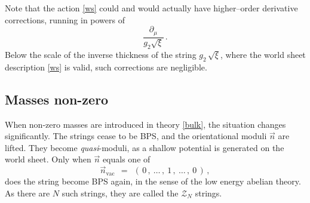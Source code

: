 \documentclass[12pt]{article}
\def\beq{\begin{equation}}
\def\eeq{\end{equation}}
\newcommand{\p}{\partial}
\newcommand{\mc}[1]{\mathcal{#1}}
\newcommand{\nvac}{\vec{n}{}_\text{vac}}
\begin{document}
	Note that the action \eqref{ws} could and would actually have higher--order derivative corrections, running in powers of
\beq
\label{higher}
	\frac{\p_\mu}{g_2\sqrt{\xi}}\,.
\eeq
	Below the scale of the inverse thickness of the string $ g_2\,\sqrt{\xi} $, where the world sheet
	description \eqref{ws} is valid, such corrections are negligible.


\subsection{Masses non-zero}

	When non-zero masses are introduced in theory \eqref{bulk}, the situation changes significantly.
	The strings cease to be BPS, and the orientational moduli $ \vec{n} $ are lifted.
	They become {\it quasi}-moduli, as a shallow potential is generated on the world sheet.
	Only when $ \vec{n} $ equals one of 
\beq
\label{nvac}
	\nvac    ~~=~~    (\, 0\,,~ \dots\,,~1\,,~ \dots\,,~ 0 \,)\,,
\eeq
	does the string become BPS again, in the sense of the low energy abelian theory.
	As there are $ N $ such strings, they are called the $ \mc{Z}_N $ strings.
\end{document}
